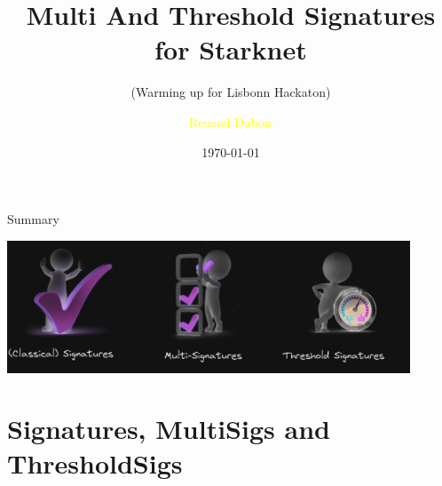 \documentclass[aspectratio=43]{beamer}
\title{Multi And Threshold Signatures for Starknet} %
\subtitle{(Warming up for Lisbonn Hackaton)}
\author[R. Dubois]{\textcolor{yellow}{Renaud Dubois}}
\institute[LIT]{
    \textcolor{white}{Ledger}%
    \\%
    \textcolor{white}{Innovation Team}%
} %
\date{\today}
\begin{document}
    
    \frame{\titlepage}
    \begin{frame}{Summary}
     
     {
     \begin{center}
     \includegraphics[width=12cm]{images/concepts.jpg}
     \end{center}
     }
     {
        \tableofcontents
      }  
   
    \end{frame} 
   \section{Signatures, MultiSigs and ThresholdSigs }
\end{document}
